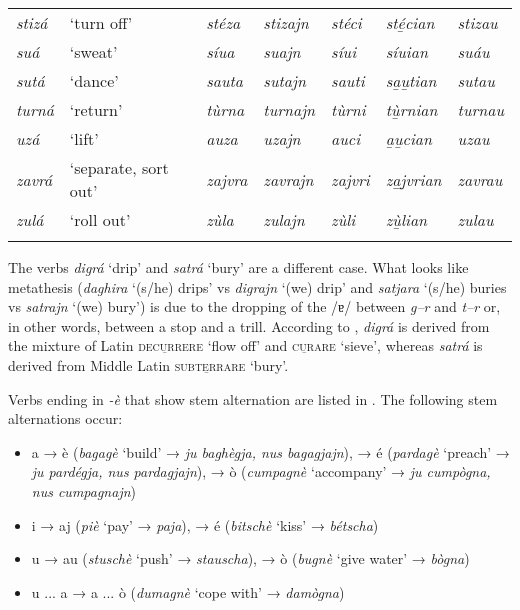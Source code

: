 \begin{sidewaystable}
\begin{tabularx}{\textwidth}{lllllll}
		\textit{stizá} & `turn off' & \textit{stéza} & \textit{stizajn} & \textit{stéci} & \textit{sté̱cian} & \textit{stizau}\\
		\textit{suá} & `sweat' & \textit{síua} & \textit{suajn} & \textit{síui}& \textit{síuian} & \textit{suáu}\\
		\textit{sutá} & `dance' & \textit{sauta} & \textit{sutajn} & \textit{sauti} & \textit{sa̱u̱tian} & \textit{sutau}\\
		\textit{turná} & `return' & \textit{tùrna} & \textit{turnajn} & \textit{tùrni} & \textit{tù̱rnian} & \textit{turnau}\\
		\textit{uzá} & ‘lift’ & \textit{auza} & \textit{uzajn} & \textit{auci} & \textit{a̱u̱cian} & \textit{uzau} \\
		\textit{zavrá} & `separate, sort out' & \textit{zajvra} & \textit{zavrajn} & \textit{zajvri} & \textit{za̱j̱vrian} & \textit{zavrau}\\
		\textit{zulá} & ‘roll out’ & \textit{zùla} & \textit{zulajn} & \textit{zùli} & \textit{zù̱lian} & \textit{zulau} \\
		\lspbottomrule
	\end{tabularx}
\end{sidewaystable}


\clearpage
The verbs \textit{digrá} `drip' and \textit{satrá} `bury' are a different case. What looks like metathesis (\textit{daghira} `(s/he) drips' vs \textit{digrajn} `(we) drip' and \textit{satjara} `(s/he) buries vs \textit{satrajn} `(we) bury') is due to the dropping of the  /ɐ/ between \textit{g--r} and \textit{t--r} or, in other words, between a stop and a trill. According to \citet[311 and 973]{Decurtins2012}, \textit{digrá} is derived from the mixture of Latin \textsc{decu̱rrere} `flow off' and \textsc{cu̱rare} `sieve', whereas \textit{satrá} is derived from Middle Latin \textsc{subte̱rrare} `bury'.


Verbs ending in \textit{-è} that show stem alternation are listed in . The following stem alternations occur:

\begin{itemize}
	\item a → è (\textit{bagagè} `build' → \textit{ju baghègja, nus bagagjajn}), → é (\textit{pardagè} `preach' → \textit{ju pardégja, nus pardagjajn}), → ò (\textit{cumpagnè} `accompany' → \textit{ju cumpò\-gna, nus cumpagnajn})
	\item i → aj (\textit{piè} `pay' → \textit{paja}), → é (\textit{bitschè} `kiss' → \textit{bétscha})
	\item u → au (\textit{stuschè} `push' → \textit{stauscha}), → ò (\textit{bugnè} `give water' → \textit{bògna})
	\item u ... a → a ... ò (\textit{dumagnè} `cope with' → \textit{damògna})
	\end{itemize}
	
